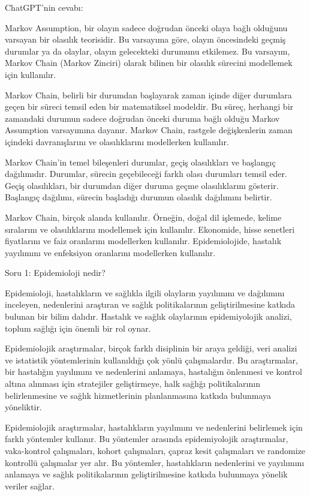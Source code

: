 \documentclass[11pt]{article}
\begin{document}
ChatGPT'nin cevabı: 

Markov Assumption, bir olayın sadece doğrudan önceki olaya bağlı olduğunu varsayan bir olasılık teorisidir. Bu varsayıma göre, olayın öncesindeki geçmiş durumlar ya da olaylar, olayın gelecekteki durumunu etkilemez. Bu varsayım, Markov Chain (Markov Zinciri) olarak bilinen bir olasılık sürecini modellemek için kullanılır.

Markov Chain, belirli bir durumdan başlayarak zaman içinde diğer durumlara geçen bir süreci temsil eden bir matematiksel modeldir. Bu süreç, herhangi bir zamandaki durumun sadece doğrudan önceki duruma bağlı olduğu Markov Assumption varsayımına dayanır. Markov Chain, rastgele değişkenlerin zaman içindeki davranışlarını ve olasılıklarını modellerken kullanılır.

Markov Chain'in temel bileşenleri durumlar, geçiş olasılıkları ve başlangıç dağılımıdır. Durumlar, sürecin geçebileceği farklı olası durumları temsil eder. Geçiş olasılıkları, bir durumdan diğer duruma geçme olasılıklarını gösterir. Başlangıç dağılımı, sürecin başladığı durumun olasılık dağılımını belirtir.

Markov Chain, birçok alanda kullanılır. Örneğin, doğal dil işlemede, kelime sıralarını ve olasılıklarını modellemek için kullanılır. Ekonomide, hisse senetleri fiyatlarını ve faiz oranlarını modellerken kullanılır. Epidemiolojide, hastalık yayılımını ve enfeksiyon oranlarını modellerken kullanılır.

Soru 1: Epidemioloji nedir?

Epidemioloji, hastalıkların ve sağlıkla ilgili olayların yayılımını ve dağılımını inceleyen, nedenlerini araştıran ve sağlık politikalarının geliştirilmesine katkıda bulunan bir bilim dalıdır. Hastalık ve sağlık olaylarının epidemiyolojik analizi, toplum sağlığı için önemli bir rol oynar.

Epidemiolojik araştırmalar, birçok farklı disiplinin bir araya geldiği, veri analizi ve istatistik yöntemlerinin kullanıldığı çok yönlü çalışmalardır. Bu araştırmalar, bir hastalığın yayılımını ve nedenlerini anlamaya, hastalığın önlenmesi ve kontrol altına alınması için stratejiler geliştirmeye, halk sağlığı politikalarının belirlenmesine ve sağlık hizmetlerinin planlanmasına katkıda bulunmaya yöneliktir.

Epidemiolojik araştırmalar, hastalıkların yayılımını ve nedenlerini belirlemek için farklı yöntemler kullanır. Bu yöntemler arasında epidemiyolojik araştırmalar, vaka-kontrol çalışmaları, kohort çalışmaları, çapraz kesit çalışmaları ve randomize kontrollü çalışmalar yer alır. Bu yöntemler, hastalıkların nedenlerini ve yayılımını anlamaya ve sağlık politikalarının geliştirilmesine katkıda bulunmaya yönelik veriler sağlar.
\end{document}
